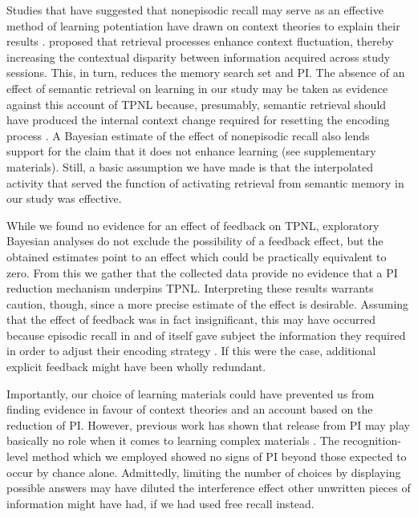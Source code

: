 \documentclass[../main.tex]{subfiles}
\begin{document}
Studies that have suggested that nonepisodic recall may serve as an effective
method of learning potentiation have drawn on context theories to explain 
their results \citep{divisRetrievalSpeedsContext2014, 
pastotterRetrievalLearningFacilitates2011}. 
\cite{divisRetrievalSpeedsContext2014} proposed that retrieval processes 
enhance context fluctuation, thereby increasing the contextual disparity 
between information acquired across study sessions. This, in turn, reduces 
the memory search set and PI. The absence of an effect of semantic retrieval 
on learning in our study may be taken as evidence against this account of 
TPNL because, presumably, semantic retrieval should have produced the 
internal context change required for resetting the encoding process 
\citep{pastotterRetrievalLearningFacilitates2011}. A Bayesian estimate of 
the effect of nonepisodic recall also lends support for the claim that it 
does not enhance learning (see supplementary materials). Still, a basic 
assumption we have made is that the interpolated activity that served the 
function of activating retrieval from semantic memory in our study was 
effective. 

While we found no evidence for an effect of feedback on TPNL, exploratory 
Bayesian analyses do not exclude the possibility of a feedback effect, but 
the obtained estimates point to an effect which could be practically 
equivalent to zero. From this we gather that the collected data provide no 
evidence that a PI reduction mechanism underpins TPNL. Interpreting these 
results warrants caution, though, since a more precise estimate of the 
effect is desirable. Assuming that the effect of feedback was in fact 
insignificant, this may have occurred because episodic recall in and of 
itself gave subject the information they required in order to adjust their 
encoding strategy \citep{kornellUnsuccessfulRetrievalAttempts2009}. If this 
were the case, additional explicit feedback might have been wholly redundant.

Importantly, our choice of learning materials could have prevented us from 
finding evidence in favour of context theories and an account based on the 
reduction of PI. However, previous work has shown that release from PI may 
play basically no role when it comes to learning complex materials 
\citep{divisRetrievalSpeedsContext2014, wissmanInterimTestEffect2011}. The 
recognition-level method which we employed showed no signs of PI beyond 
those expected to occur by chance alone. Admittedly, limiting the number of 
choices by displaying possible answers may have diluted the interference 
effect other unwritten pieces of information might have had, if we had used 
free recall instead.
\end{document}

